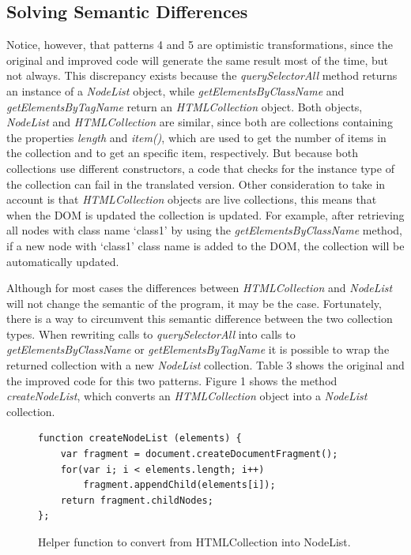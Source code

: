 \documentclass[preprint,10pt]{sigplanconf}
\begin{document}
\subsection{Solving Semantic Differences}
Notice, however, that patterns 4 and 5 are optimistic transformations, since the original and improved code will generate the same result most of the time, but not always. This discrepancy exists because the \emph{querySelectorAll} method returns an instance of a \emph{NodeList} object, while \emph{getElementsByClassName} and \emph{getElementsByTagName} return an \emph{HTMLCollection} object. Both objects, \emph{NodeList} and \emph{HTMLCollection} are similar, since both are collections containing the properties \emph{length} and \emph{item()}, which are used to get the number of items in the collection and to get an specific item, respectively. But because both collections use different constructors, a code that checks for the instance type of the collection can fail in the translated version. Other consideration to take in account is that \emph{HTMLCollection} objects are live collections, this means that when the DOM is updated the collection is updated. For example, after retrieving all nodes with class name `class1' by using the \emph{getElementsByClassName} method, if a new node with `class1' class name is added to the DOM, the collection will be automatically updated.

Although for most cases the differences between \emph{HTMLCollection} and \emph{NodeList} will not change the semantic of the program, it may be the case. Fortunately, there is a way to circumvent this semantic difference between the two collection types. When rewriting calls to \emph{querySelectorAll} into calls to \emph{getElementsByClassName} or \emph{getElementsByTagName} it is possible to wrap the returned collection with a new \emph{NodeList} collection. Table 3 shows the original and the improved code for this two patterns. Figure 1 shows the method \emph{createNodeList}, which converts an \emph{HTMLCollection} object into a \emph{NodeList} collection.

\lstset{style=full}

\begin{figure}
\begin{lstlisting}
function createNodeList (elements) {
    var fragment = document.createDocumentFragment();
    for(var i; i < elements.length; i++)
        fragment.appendChild(elements[i]);
    return fragment.childNodes;
};
\end{lstlisting}
\caption{Helper function to convert from HTMLCollection into NodeList.}
\label{fig:1}
\end{figure}
\end{document}
